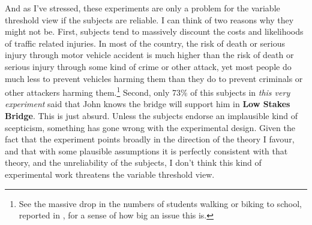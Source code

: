 And as I've stressed, these experiments are only a problem for the variable threshold view if the subjects are reliable. I can think of two reasons why they might not be. First, subjects tend to massively discount the costs and likelihoods of traffic related injuries. In most of the country, the risk of death or serious injury through motor vehicle accident is much higher than the risk of death or serious injury through some kind of crime or other attack, yet most people do much less to prevent vehicles harming them than they do to prevent criminals or other attackers harming them.\footnote{See the massive drop in the numbers of students walking or biking to school, reported in \cite{Ham2008}, for a sense of how big an issue this is.} Second, only 73\% of this subjects in \textit{this very experiment} said that John knows the bridge will support him in \textbf{Low Stakes Bridge}. This is just absurd. Unless the subjects endorse an implausible kind of scepticism, something has gone wrong with the experimental design. Given the fact that the experiment points broadly in the direction of the theory I favour, and that with some plausible assumptions it is perfectly consistent with that theory, and the unreliability of the subjects, I don't think this kind of experimental work threatens the variable threshold view.